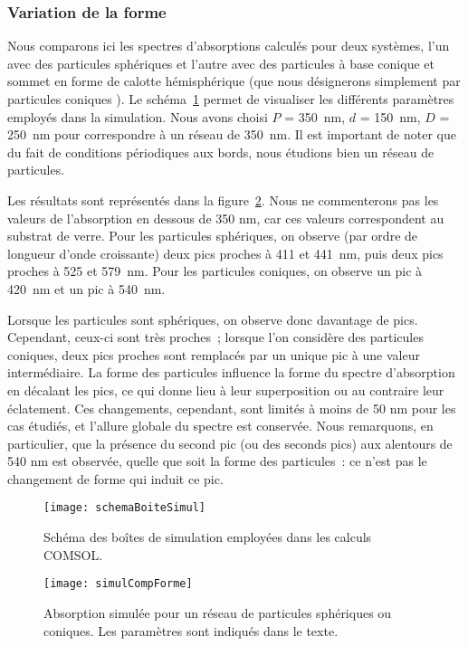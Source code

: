 	\subsubsection{Variation de la forme}
Nous comparons ici les spectres d’absorptions calculés pour deux systèmes, l’un avec des particules sphériques et l’autre avec des particules à base conique et sommet en forme de calotte hémisphérique (que nous désignerons simplement par \og particules coniques \fg). Le schéma~\ref{schemaBoiteSimul} permet de visualiser les différents paramètres employés dans la simulation. Nous avons choisi $P$ = 350~nm, $d$ = 150~nm, $D$ = 250~nm pour correspondre à un réseau de 350~nm. Il est important de noter que du fait de conditions périodiques aux bords, nous étudions bien un réseau de particules.\par 
Les résultats sont représentés dans la figure~\ref{simulCompForme}. Nous ne commenterons pas les valeurs de l’absorption en dessous de 350 nm, car ces valeurs correspondent au substrat de verre. Pour les particules sphériques, on observe (par ordre de longueur d’onde croissante) deux pics proches à 411 et 441~nm, puis deux pics proches à 525 et 579~nm. Pour les particules coniques, on observe un pic à 420~nm et un pic à 540~nm.\par 
Lorsque les particules sont sphériques, on observe donc davantage de pics. Cependant, ceux-ci sont très proches~; lorsque l’on considère des particules coniques, deux pics proches sont remplacés par un unique pic à une valeur intermédiaire. La forme des particules influence la forme du spectre d’absorption en décalant les pics, ce qui donne lieu à leur superposition ou au contraire leur éclatement. Ces changements, cependant, sont limités à moins de 50 nm pour les cas étudiés, et l'allure globale du spectre est conservée. Nous remarquons, en particulier, que la présence du second pic (ou des seconds pics) aux alentours de 540 nm est observée, quelle que soit la forme des particules~: ce n’est pas le changement de forme qui induit ce pic.\par 
\begin{figure}[!htb]
\centering
\texttt{[image: schemaBoiteSimul]}
\caption{Schéma des boîtes de simulation employées dans les calculs COMSOL.}
\label{schemaBoiteSimul}
\end{figure}
\begin{figure}[!htb]
\centering
\texttt{[image: simulCompForme]}
\caption{Absorption simulée pour un réseau de particules sphériques ou coniques. Les paramètres sont indiqués dans le texte.}
\label{simulCompForme}
\end{figure}
